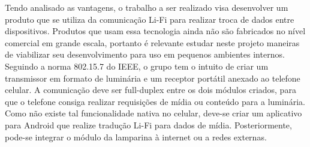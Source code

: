  Tendo analisado as vantagens, o trabalho a ser realizado visa desenvolver um produto que se utiliza da comunicação Li-Fi para realizar troca de dados entre dispositivos. Produtos que usam essa tecnologia ainda não são fabricados no nível comercial em grande escala, portanto é relevante estudar neste projeto maneiras de viabilizar seu desenvolvimento para uso em pequenos ambientes internos. Seguindo a norma 802.15.7 do IEEE, o grupo tem o intuito de criar um transmissor em formato de luminária e um receptor portátil anexado ao telefone celular. A comunicação deve ser full-duplex entre os dois módulos criados, para que o telefone consiga realizar requisições de mídia ou conteúdo para a luminária. Como não existe tal funcionalidade nativa no celular, deve-se criar um aplicativo para Android que realize tradução Li-Fi para dados de mídia. Posteriormente, pode-se integrar o módulo da lamparina à internet ou a redes externas.
 